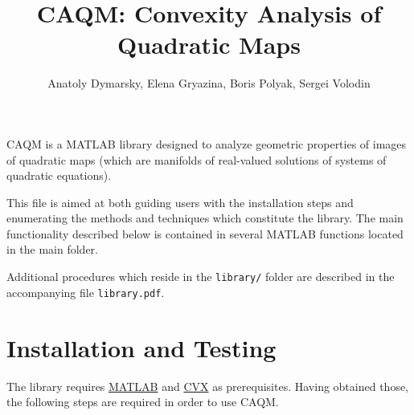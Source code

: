 \documentclass[a4paper]{article}
\title{CAQM: Convexity Analysis of Quadratic Maps}
\date{}
\author{Anatoly Dymarsky, Elena Gryazina, Boris Polyak, Sergei Volodin}
\theoremstyle{definition}
\begin{document}
\maketitle
CAQM is a MATLAB library designed to analyze geometric properties of images of quadratic maps (which are manifolds of real-valued solutions of systems of quadratic equations).

This file is aimed at both guiding users with the installation steps and enumerating the methods and techniques which constitute the library. The main functionality described below is contained in several MATLAB functions located in the main folder.

Additional procedures which reside in the {\tt library/} folder are described in the accompanying file {\tt library.pdf}.

\section*{Installation and Testing}
The library requires \href{https://www.mathworks.com/downloads/}{MATLAB} and \href{http://cvxr.com/cvx/download/}{CVX} as prerequisites. Having obtained those, the following steps are required in order to use CAQM.
\end{document}
